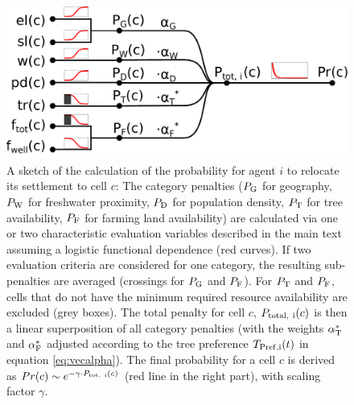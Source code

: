 \begin{figure}
	\centering
	\includegraphics[width=1\textwidth]{images/SketchABM2/sketchMoving}
	\caption{A sketch of the calculation of the probability for agent $i$ to relocate its settlement to cell $c$: The category penalties ($P_{\rm G}$ for geography, $P_{\rm W}$ for freshwater proximity, $P_{\rm D}$ for population density, $P_{\rm T}$ for tree availability, $P_{\rm F}$ for farming land availability) are calculated via one or two characteristic evaluation variables described in the main text assuming a logistic functional dependence (red curves). 
	If two evaluation criteria are considered for one category, the resulting sub-penalties are averaged (crossings for $P_{\rm G}$ and $P_{\rm F}$).
	For $P_{\rm T}$ and $P_{\rm F}$, cells that do not have the minimum required resource availability are excluded (grey boxes).
	The total penalty for cell $c$, $P_{\rm total, \ i}(c)$ is then a linear superposition of all category penalties (with the weights $\alpha_{\rm T}^*$ and $\alpha_{\rm F}^*$ adjusted according to the tree preference $T_{\rm Pref, i}(t)$ in equation \ref{eq:vecalpha}).
	The final probability for a cell $c$ is derived as $Pr(c) \sim e^{-\gamma \cdot P_{\rm tot, \ i}(c)}$ (red line in the right part), with scaling factor $\gamma$.} 
	\label{fig:sketchmoving}
\end{figure}





